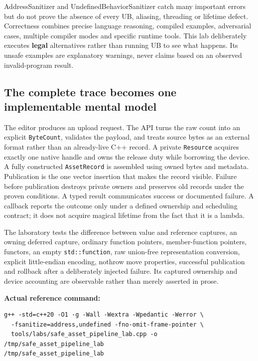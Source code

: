 AddressSanitizer and UndefinedBehaviorSanitizer catch many important errors but do not prove the absence of every UB, aliasing, threading or lifetime defect. Correctness combines precise language reasoning, compiled examples, adversarial cases, multiple compiler modes and specific runtime tools. This lab deliberately executes \textbf{legal} alternatives rather than running UB to see what happens. Its unsafe examples are explanatory warnings, never claims based on an observed invalid-program result.

\subsection{The complete trace becomes one implementable mental model}\label{05-engine-i-ch004-the-complete-trace-becomes-one-implementable-mental-model}

\hypertarget{05-engine-i-ch004-the-complete-trace-becomes-one-implementable-mental-model}{}

The editor produces an upload request. The API turns the raw count into an explicit \texttt{ByteCount}, validates the payload, and treats source bytes as an external format rather than an already-live C++ record. A private \texttt{Resource} acquires exactly one native handle and owns the release duty while borrowing the device. A fully constructed \texttt{AssetRecord} is assembled using owned bytes and metadata. Publication is the one vector insertion that makes the record visible. Failure before publication destroys private owners and preserves old records under the proven conditions. A typed result communicates success or documented failure. A callback reports the outcome only under a defined ownership and scheduling contract; it does not acquire magical lifetime from the fact that it is a lambda.

The laboratory tests the difference between value and reference captures, an owning deferred capture, ordinary function pointers, member-function pointers, functors, an empty \texttt{std::function}, raw union-free representation conversion, explicit little-endian encoding, nothrow move properties, successful publication and rollback after a deliberately injected failure. Its captured ownership and device accounting are observable rather than merely asserted in prose.

\textbf{Actual reference command:}

\begin{verbatim}
g++ -std=c++20 -O1 -g -Wall -Wextra -Wpedantic -Werror \
  -fsanitize=address,undefined -fno-omit-frame-pointer \
  tools/labs/safe_asset_pipeline_lab.cpp -o /tmp/safe_asset_pipeline_lab
/tmp/safe_asset_pipeline_lab
\end{verbatim}

